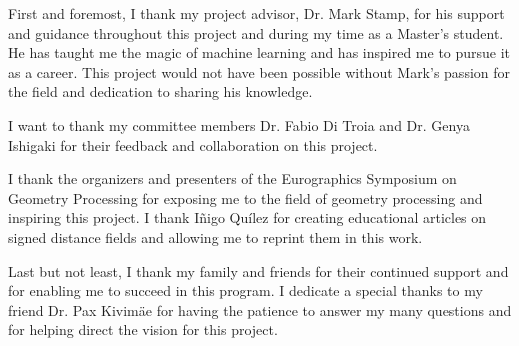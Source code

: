 
First and foremost, I thank my project advisor, Dr. Mark Stamp, for his support and guidance throughout this project and during my time as a Master's student. He has taught me the magic of machine learning and has inspired me to pursue it as a career. This project would not have been possible without Mark's passion for the field and dedication to sharing his knowledge.

I want to thank my committee members Dr. Fabio Di Troia and Dr. Genya Ishigaki for their feedback and collaboration on this project.

I thank the organizers and presenters of the Eurographics Symposium on Geometry Processing for exposing me to the field of geometry processing and inspiring this project. I thank I{\~n}igo Qu{\'i}lez for creating educational articles on signed distance fields and allowing me to reprint them in this work.

Last but not least, I thank my family and friends for their continued support and for enabling me to succeed in this program. I dedicate a special thanks to my friend Dr. Pax Kivim{\"a}e for having the patience to answer my many questions and for helping direct the vision for this project.